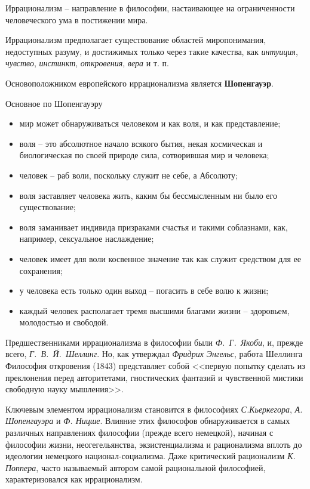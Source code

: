 
Иррационализм -- направление в философии, настаивающее на ограниченности человеческого ума в постижении мира. 

Иррационализм предполагает существование областей миропонимания, недоступных разуму, и достижимых только 
через такие качества, как \emph{интуиция}, \emph{чувство}, \emph{инстинкт}, \emph{откровения}, 
\emph{вера} и т. п.

Основоположником европейского иррационализма является \textbf{Шопенгауэр}. 

Основное по Шопенгауэру
\begin{itemize}
    \item мир может обнаруживаться человеком и как воля, и как представление;
    \item воля -- это абсолютное начало всякого бытия, некая космическая и биологическая по своей природе 
        сила, сотворившая мир и человека;
    \item человек -- раб воли, поскольку служит не себе, а Абсолюту;
    \item воля заставляет человека жить, каким бы бессмысленным ни было его существование;
    \item воля заманивает индивида призраками счастья и такими соблазнами, как, например, сексуальное 
        наслаждение;
    \item человек имеет для воли косвенное значение так как служит средством для ее сохранения;
    \item у человека есть только один выход -- погасить в себе волю к жизни;
    \item каждый человек располагает тремя высшими благами жизни -- здоровьем, молодостью и свободой.
\end{itemize}

Предшественниками иррационализма в философии были \emph{Ф.~Г.~Якоби}, и, прежде всего, 
\emph{Г.~В.~Й.~Шеллинг}. Но, как утверждал \emph{Фридрих Энгельс}, работа Шеллинга Философия откровения 
(1843) представляет собой <<первую попытку сделать из преклонения перед авторитетами, гностических фантазий 
и чувственной мистики свободную науку мышления>>.

Ключевым элементом иррационализм становится в философиях \emph{С.Кьеркегора}, \emph{А. Шопенгауэра} и 
\emph{Ф. Ницше}. Влияние этих философов обнаруживается в самых различных направлениях философии (прежде 
всего немецкой), начиная с философии жизни, неогегельянства, экзистенциализма и рационализма вплоть до 
идеологии немецкого национал-социализма. Даже критический рационализм \emph{К. Поппера}, часто называемый 
автором самой рациональной философией, характеризовался как иррационализм.

